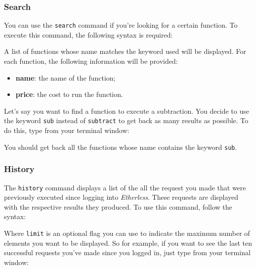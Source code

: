 \subsubsection{Search}
You can use the \texttt{search} command if you're looking for a certain function. To execute this command, the following syntax is required:
\begin{center}
\end{center}

A list of functions whose name matches the keyword used will be displayed. For each function, the following information will be provided:
\begin{itemize}
	\item \textbf{name}: the name of the function;
	\item \textbf{price}: the cost to run the function.
\end{itemize}
Let's say you want to find a function to execute a subtraction. You decide to use the keyword \texttt{sub} instead of \texttt{subtract} to get back as many results as possible. To do this, type from your terminal window:
\begin{center}
\end{center}
You should get back all the functions whose name contains the keyword \texttt{sub}.

\subsubsection{History}
The \texttt{history} command displays a list of the all the request you made that were previously executed since logging into \textit{Etherless}. These requests are displayed with the respective results they produced. To use this command, follow the syntax:
\begin{center}
\end{center}
Where \texttt{limit} is an optional flag you can use to indicate the maximum number of elements you want to be displayed.
So for example, if you want to see the last ten successful requests you've made since you logged in, just type from your terminal window:
\begin{center}
\end{center}

